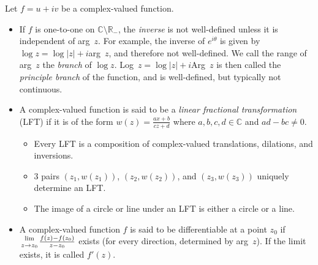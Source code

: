 \documentclass[12pt]{article}
\begin{document}
Let $f = u + iv$ be a complex-valued function.
\begin{itemize}
	\item If $f$ is one-to-one on $\mathbb{C} \setminus \mathbb{R}_-$,
		the {\it inverse} is not well-defined unless it is
		independent of arg~$z$.
		For example, the inverse of $e^{i\theta}$ is given by
		$\log z = \log |z| + i$arg~$z$, and therefore not
		well-defined. We call the range of arg~$z$ the {\it branch}
		of $\log z$. Log~$z = \log|z| + i$Arg~$z$ is then called
		the {\it principle branch} of the function, and is
		well-defined, but typically not continuous.
	\item A complex-valued function is said to be a
		{\it linear fractional transformation} (LFT) if it is of
		the form $w(z) =\frac{ax + b}{cz + d}$ where 
		$a,b,c,d\in\mathbb{C}$ and $ad-bc\neq 0$.
		\begin{itemize}
			\item Every LFT is a composition of complex-valued
				translations, dilations, and inversions.
			\item 3 pairs $(z_1, w(z_1))$, $(z_2, w(z_2))$,
				and $(z_3, w(z_3))$ uniquely determine an
				LFT.
			\item The image of a circle or line under an LFT is
				either a circle or a line.
		\end{itemize}
	\item A complex-valued function $f$ is said to be differentiable
		at a point $z_0$ if
		${\lim \atop z\rightarrow z_0}\frac{f(z)-f(z_0)}{z-z_0}$
		exists (for every direction, determined by arg~$z$).
		If the limit exists, it is called $f'(z)$.
\end{itemize}
\end{document}

